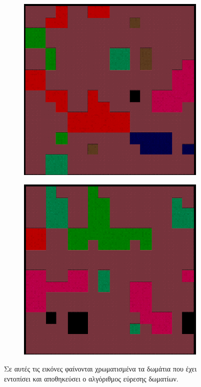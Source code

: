 \begin{figure}[H]
\begin{subfigure}{.5\textwidth}
  \includegraphics[width=.8\linewidth]{../images/colored_rooms/3.png}
  \label{fig:sfig1}
\end{subfigure}%
\begin{subfigure}{.5\textwidth}
  \centering
  \includegraphics[width=.8\linewidth]{../images/colored_rooms/4.png}
  \label{fig:sfig2}
\end{subfigure}
\caption{Σε αυτές τις εικόνες φαίνονται χρωματισμένα τα δωμάτια που έχει εντοπίσει και αποθηκεύσει ο αλγόριθμος εύρεσης δωματίων.}
\label{fig:fig}
\end{figure} 



